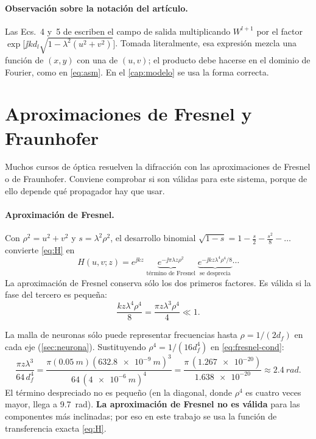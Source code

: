 \paragraph{Observación sobre la notación del artículo.} Las Ecs.~4 y~5 de
\textcite{chen2021} escriben el campo de salida multiplicando $W^{l+1}$ por el factor
$\exp\bigl[\jj kd_l\sqrt{1-\lambda^2(u^2+v^2)}\bigr]$. Tomada literalmente, esa
expresión mezcla una función de $(x,y)$ con una de $(u,v)$; el producto debe hacerse en el
dominio de Fourier, como en \eqref{eq:asm}. En el \cref{cap:modelo} se usa la forma correcta.

\section{Aproximaciones de Fresnel y Fraunhofer}\label{sec:fresnel}

Muchos cursos de óptica resuelven la difracción con las aproximaciones de Fresnel o de
Fraunhofer. Conviene comprobar si son válidas para este sistema, porque de ello depende qué
propagador hay que usar.

\paragraph{Aproximación de Fresnel.} Con $\rho^2=u^2+v^2$ y $s=\lambda^2\rho^2$, el desarrollo
binomial $\sqrt{1-s}=1-\tfrac{s}{2}-\tfrac{s^2}{8}-\dots$ convierte \eqref{eq:H} en
\begin{equation}
  H(u,v;z)=e^{\jj kz}\;
  \underbrace{e^{-\jj\pi\lambda z\rho^2}}_{\text{término de Fresnel}}\;
  \underbrace{e^{-\jj kz\lambda^4\rho^4/8}}_{\text{se desprecia}}\cdots
  \label{eq:fresnel-tf}
\end{equation}
La aproximación de Fresnel conserva sólo los dos primeros factores. Es válida si la fase
del tercero es pequeña:
\begin{equation}
  \frac{kz\lambda^4\rho^4}{8}=\frac{\pi z\lambda^3\rho^4}{4}\ll 1 .
  \label{eq:fresnel-cond}
\end{equation}

\begin{calculo}
La malla de neuronas sólo puede representar frecuencias hasta $\rho=1/(2d_f)$ en cada eje
(\cref{sec:neurona}). Sustituyendo $\rho^4=1/(16d_f^4)$ en \eqref{eq:fresnel-cond}:
\[
  \frac{\pi z\lambda^3}{64\,d_f^4}
  =\frac{\pi(\SI{0.05}{m})(\SI{632.8e-9}{m})^3}{64\,(\SI{4e-6}{m})^4}
  =\frac{\pi\,(\num{1.267e-20})}{\num{1.638e-20}}
  \approx\SI{2.4}{rad}.
\]
El término despreciado no es pequeño (en la diagonal, donde $\rho^4$ es cuatro veces
mayor, llega a \SI{9.7}{rad}). \textbf{La aproximación de Fresnel no es válida} para las
componentes más inclinadas; por eso en este trabajo se usa la función de transferencia
exacta \eqref{eq:H}.
\end{calculo}

